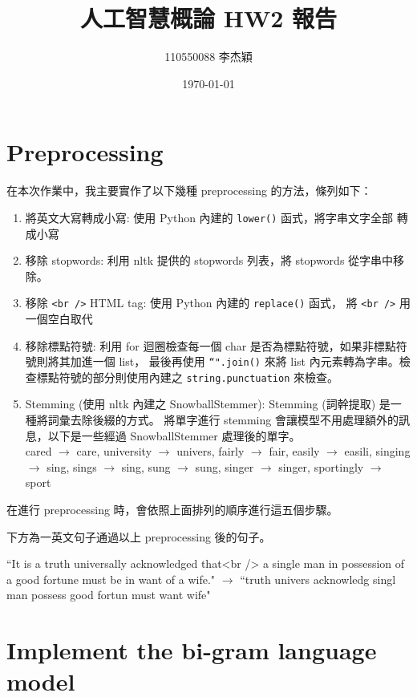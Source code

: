 \documentclass{article}[12pt]
\title{人工智慧概論 HW2 報告}
\author{110550088 李杰穎}
\date{\today}
\begin{document}
\maketitle

\section{Preprocessing}
在本次作業中，我主要實作了以下幾種 preprocessing 的方法，條列如下：
\begin{enumerate}
    \item 將英文大寫轉成小寫: 使用 Python 內建的 \texttt{lower()} 函式，將字串文字全部
    轉成小寫
    \item 移除 stopwords: 利用 nltk 提供的 stopwords 列表，將 stopwords 從字串中移除。
    \item 移除 \texttt{<br />} HTML tag: 使用 Python 內建的 \texttt{replace()} 函式，
    將 \texttt{<br />} 用一個空白取代
    \item 移除標點符號: 利用 for 迴圈檢查每一個 char 是否為標點符號，如果非標點符號則將其加進一個 list，
    最後再使用 \texttt{``".join()} 來將 list 內元素轉為字串。檢查標點符號的部分則使用內建之
    \texttt{string.punctuation} 來檢查。
    \item Stemming (使用 nltk 內建之 SnowballStemmer): Stemming (詞幹提取) 是一種將詞彙去除後綴的方式。
    將單字進行 stemming 會讓模型不用處理額外的訊息，以下是一些經過 SnowballStemmer 處理後的單字。\\
    cared $\rightarrow$         care, 
    university $\rightarrow$     univers, 
    fairly $\rightarrow$         fair, 
    easily $\rightarrow$         easili,
    singing $\rightarrow$       sing, 
    sings $\rightarrow$         sing,  
    sung  $\rightarrow$          sung,  
    singer $\rightarrow$        singer,  
    sportingly $\rightarrow$     sport
\end{enumerate}

在進行 preprocessing 時，會依照上面排列的順序進行這五個步驟。

下方為一英文句子通過以上 preprocessing 後的句子。

\small{``It is a truth universally acknowledged that<br /> 
a single man in possession of a good fortune must be in want of a wife." $\rightarrow$
``truth univers acknowledg singl man possess good fortun must want wife"}

\section{Implement the bi-gram language model}
\end{document}
